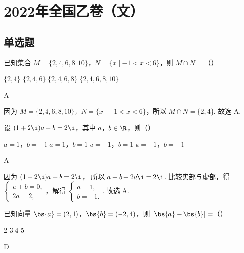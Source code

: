 \chapter{2022年全国乙卷（文）}
\section{单选题}

\begin{problem}
已知集合 \(M=\{2,4,6,8,10\}\)，\(N=\{x\mid -1<x<6\}\)，则 \(M\cap N=\)（\quad）

\choices
    {\(\{2,4\}\)}
    {\(\{2,4,6\}\)}
    {\(\{2,4,6,8\}\)}
    {\(\{2,4,6,8,10\}\)}
\end{problem}

\begin{answer}
A
\end{answer}

\begin{solution}
因为 \(M=\{2,4,6,8,10\}\)，\(N=\{x\mid -1<x<6\}\)，所以
\(M\cap N=\{2,4\}\).
故选 A.
\end{solution}

\begin{problem}
设 \((1+2\i)a+b=2\i\)，其中 \(a\)，\(b\in\R\)，则（\quad）

\choices
    {\(a=1\)，\(b=-1\)}
    {\(a=1\)，\(b=1\)}
    {\(a=-1\)，\(b=1\)}
    {\(a=-1\)，\(b=-1\)}
\end{problem}

\begin{answer}
A
\end{answer}

\begin{solution}
因为
\((1+2\i)a+b=2\i\)，
所以
\(a+b+2a\i=2\i\).
比较实部与虚部，得 \(\begin{cases}
a+b=0,\\
2a=2,
\end{cases}\)，解得 \(\begin{cases}
a=1,\\
b=-1.
\end{cases}\).
故选 A.
\end{solution}

\begin{problem}
已知向量 \(\bs{a}=(2,1)\)，\(\bs{b}=(-2,4)\)，则 \(\left|\bs{a}-\bs{b}\right|=\)（\quad）

\choices
    {2}
    {3}
    {4}
    {5}
\end{problem}

\begin{answer}
D
\end{answer}

